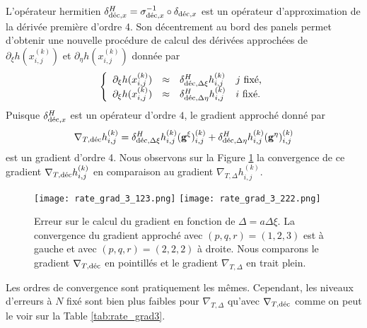 L'opérateur hermitien $\delta^H_{\dec,x} = \sigma_{\dec,x}^{-1} \circ \delta_{\dec,x}$ est un opérateur d'approximation de la dérivée première d'ordre 4. Son décentrement au bord des panels permet d'obtenir une nouvelle procédure de calcul des dérivées approchées de $\partial_{\xi} h(x_{i,j}^{(k)})$ et $\partial_{\eta} h(x_{i,j}^{(k)})$ donnée par 
\begin{equation}
\left\lbrace
\begin{array}{rcll}
\partial_{\xi} h(x_{i,j}^{(k)}) & \approx & \delta^H_{\dec,\Delta \xi} h_{i,j}^{(k)} & j \text{ fixé,}\\
\partial_{\xi} h(x_{i,j}^{(k)}) & \approx & \delta^H_{\dec,\Delta \eta} h_{i,j}^{(k)} & i \text{ fixé.}
\end{array}
\right.
\end{equation}
Puisque $\delta^H_{\dec,x}$ est un opérateur d'ordre $4$, le gradient approché donné par 
\begin{equation}
\nabla_{T,\dec} h_{i,j}^{(k)} = \delta^H_{\dec,\Delta \xi} h_{i,j}^{(k)} ( \mathbf{g}^{\xi} )_{i,j}^{(k)} + \delta^H_{\dec,\Delta \eta} h_{i,j}^{(k)} ( \mathbf{g}^{\eta} )_{i,j}^{(k)}
\end{equation}
est un gradient d'ordre 4.
Nous observons sur la Figure \ref{fig:rate_grad3} la convergence de ce gradient $\nabla_{T,\dec} h_{i,j}^{(k)}$ en comparaison au gradient $\nabla_{T,\Delta} h_{i,j}^{(k)}$.
\begin{figure}[htbp]
\begin{center}
\texttt{[image: rate\_grad\_3\_123.png]}
\texttt{[image: rate\_grad\_3\_222.png]}
\end{center}
\caption{Erreur sur le calcul du gradient en fonction de $\Delta = a \Delta \xi$. La convergence du gradient approché avec $(p,q,r)=(1,2,3)$ est à gauche et avec $(p,q,r)=(2,2,2)$ à droite. Nous comparons le gradient $\nabla_{T,\dec}$ en pointillés et le gradient $\nabla_{T,\Delta}$ en trait plein.}
\label{fig:rate_grad3}
\end{figure}
Les ordres de convergence sont pratiquement les mêmes. Cependant, les niveaux d'erreurs à $N$ fixé sont bien plus faibles pour $\nabla_{T,\Delta}$ qu'avec $\nabla_{T,\dec}$ comme on peut le voir sur la Table \ref{tab:rate_grad3}.

